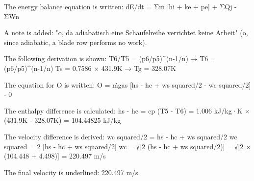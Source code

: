 The energy balance equation is written:  
dE/dt = Σṁ [hi + ke + pe] + ΣQj - ΣWn  

A note is added: "o, da adiabatisch eine Schaufelreihe verrichtet keine Arbeit" (o, since adiabatic, a blade row performs no work).  

The following derivation is shown:  
T6/T5 = (p6/p5)^(n-1/n) → T6 = (p6/p5)^(n-1/n)  
Ts = 0.7586 × 431.9K → Tg = 328.07K  

The equation for O is written:  
O = ṁgas [hs - hc + ws squared/2 - wc squared/2] - 0  

The enthalpy difference is calculated:  
hs - hc = cp (T5 - T6) = 1.006 kJ/kg·K × (431.9K - 328.07K) = 104.44825 kJ/kg  

The velocity difference is derived:  
wc squared/2 = hs - hc + ws squared/2  
wc squared = 2 [hs - hc + ws squared/2]  
wc = √[2 (hs - hc + ws squared/2)] = √[2 × (104.448 + 4.498)] = 220.497 m/s  

The final velocity is underlined: 220.497 m/s.